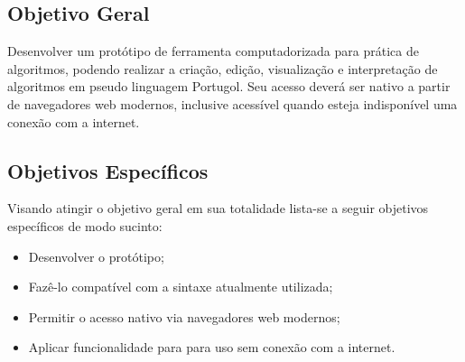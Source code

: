 \subsection{Objetivo Geral}

Desenvolver um protótipo de ferramenta computadorizada para prática de algoritmos, podendo realizar a criação, edição, visualização e interpretação de algoritmos em pseudo linguagem Portugol. Seu acesso deverá ser nativo a partir de navegadores web modernos, inclusive acessível quando esteja indisponível uma conexão com a internet.

\subsection{Objetivos Específicos}

Visando atingir o objetivo geral em sua totalidade lista-se a seguir objetivos
específicos de modo sucinto:

\begin{itemize}
\setlength\itemsep{0em}

\item Desenvolver o protótipo;

\item Fazê-lo compatível com a sintaxe atualmente utilizada;

\item Permitir o acesso nativo via navegadores web modernos;


\item Aplicar funcionalidade para para uso sem conexão com a internet.

\end{itemize}
